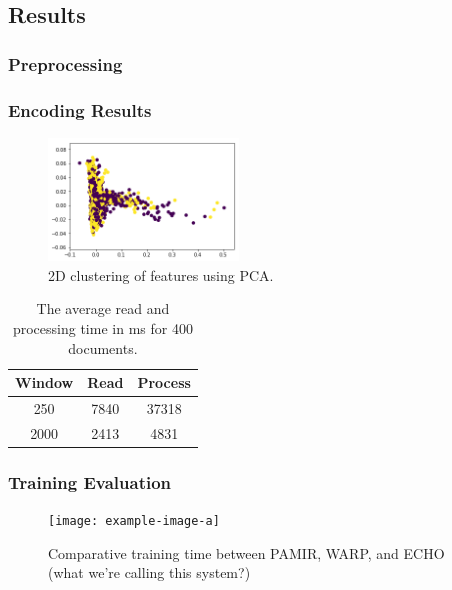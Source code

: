 \subsection{Results}

\subsubsection{Preprocessing}


\subsubsection{Encoding Results}
\label{sec:evaluation-encoding}

\begin{figure}[h]
    \centering
    \includegraphics[width=0.45\textwidth]{figures/pca-cluster-hl.png}
    \caption{2D clustering of features using PCA.}
    \label{fig:pcahl}
\end{figure}

\begin{table}[t]
    \centering
    \begin{tabular}{c|cc}
    \textbf{Window} & \textbf{Read} & \textbf{Process} \\ \hline
    250              & 7840           & 37318                    \\
    2000             & 2413           & 4831                   
    \end{tabular}
    \caption{The average read and processing time in ms for 400 documents.}
    \label{tab:base-time}
\end{table}

\subsubsection{Training Evaluation}

\begin{figure}
    \centering
    \texttt{[image: example-image-a]}
    \caption{Comparative training time between PAMIR, WARP, and ECHO (what we're calling this system?)}
    \label{fig:my-label}
\end{figure}

